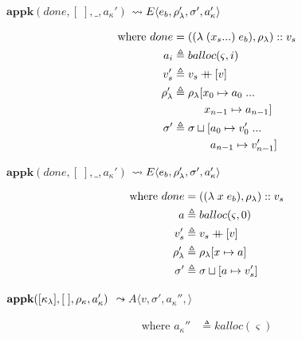 \documentclass[12pt,draft]{article}
\newcommand\mdoubleplus{\ensuremath{\mathbin{+\mkern-9mu+}}}
\newcommand{\lamsyn}[2]{(\lambda\;(#1 ...)\;#2)}
\newcommand{\vararglamsyn}[2]{(\lambda\;#1\;#2)}
\newcommand{\store}[0]{\sigma}
\newcommand{\kaddr}[0]{a_{\kappa}}
\newcommand{\kont}[0]{\kappa}
\newcommand{\state}[0]{\varsigma}
\newcommand{\E}[4]{E\langle #1 , #2 , #3 , #4 \rangle}
\newcommand{\A}[4]{A\langle #1 , #2 , #3 , #4 \rangle}
\begin{document}
\begin{multicols*}{2}
\vfill\null
\columnbreak


\begin{center}
  $\textbf{appk}(done, [\;] , \_ , \kaddr')$
  $\leadsto \E{e_b}{\lamenv'}{\store'}{\kaddr'}$
\end{center}
\vspace{-7mm}
\begin{align*}
  \text{where }
  done &= (\lamsyn{x_s}{e_b} , \lamenv) :: v_s \\
  a_i &\triangleq balloc(\state, i) \\
  v'_s &\triangleq v_s \mdoubleplus [v] \\
  \lamenv' &\triangleq \lamenv[x_0 \mapsto a_0\;...\\
       &\;\;\;\;\;\;\;\;\;\;x_{n-1} \mapsto a_{n-1}] \\
  \store' &\triangleq \store \sqcup [a_0 \mapsto v'_0\;...\\
  &\;\;\;\;\;\;\;\;\;\;\;\; a_{n-1} \mapsto v'_{n-1}]
\end{align*}
\begin{center}
  $\textbf{appk}(done, [\;], \_, \kaddr')$
  $\leadsto \E{e_b}{\lamenv'}{\store'}{\kaddr'}$
\end{center}
\vspace{-7mm}
\begin{align*}
  \text{where }
  done &= (\vararglamsyn{x}{e_b} , \lamenv) :: v_s \\
  a &\triangleq balloc(\state, 0) \\
  v'_s &\triangleq v_s \mdoubleplus [v] \\
  \lamenv' &\triangleq \lamenv[x \mapsto a] \\
  \store' &\triangleq \store \sqcup [a \mapsto v'_s]
\end{align*}
\begin{center}
  $\textbf{appk}([\kont_\lambda] , [\;] , \kenv , \kaddr')$
  $\leadsto \A{v}{\store'}{\kaddr''}{}$
\end{center}
\vspace{-6mm}
\begin{align*}
  \text{where }
  \kaddr'' &\triangleq kalloc(\state) \\

\end{align*}
\end{multicols*}
\end{document}
